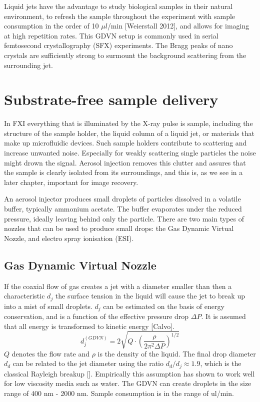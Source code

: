 Liquid jets have the advantage to study biological samples in their natural environment, to refresh the sample throughout the experiment with sample consumption in the order of 10 $\mu l$/min [Weierstall 2012], and allows for imaging at high repetition rates. This GDVN setup is commonly used in serial femtosecond crystallography (SFX) experiments. The Bragg peaks of nano crystals are sufficiently strong to surmount the background scattering from the surrounding jet.

\section{Substrate-free sample delivery}
In FXI everything that is illuminated by the X-ray pulse is sample, including the structure of the sample holder, the liquid column of a liquid jet, or materials that make up microfluidic devices. Such sample holders contribute to scattering and increase unwanted noise. Especially for weakly scattering single particles the noise might drown the signal. Aerosol injection removes this clutter and assures that the sample is clearly isolated from its surroundings, and this is, as we see in a later chapter, important for image recovery.

An aerosol injector produces small droplets of particles dissolved in a volatile buffer, typically ammonium acetate. The buffer evaporates under the reduced pressure, ideally leaving behind only the particle. There are two main types of nozzles that can be used to produce small drops: the Gas Dynamic Virtual Nozzle, and electro spray ionisation (ESI).

\subsection{Gas Dynamic Virtual Nozzle}

If the coaxial flow of gas creates a jet with a diameter smaller than then a characteristic $d_j$ the surface tension in the liquid will cause the jet to break up into a mist of small droplets. $d_j$ can be estimated on the basis of energy conservation, and is a function of the effective pressure drop $\Delta P$. It is assumed that all energy is transformed to kinetic energy [Calvo].
\begin{equation}
d_j^{(GDVN)} = 2 \sqrt{Q \cdot \left(\frac{\rho}{2 \pi^2 \Delta P}\right)^{1/2}}
\end{equation}    
$Q$ denotes the flow rate and $\rho$ is the density of the liquid. The final drop diameter $d_d$ can be related to the jet diameter using the ratio $d_d / d_j \approx 1.9$, which is the classical Rayleigh breakup []. Empirically this assumption has shown to work well for low viscosity media such as water. The GDVN can create droplets in the size range of 400 nm - 2000 nm. Sample consumption is in the range of ul/min.

